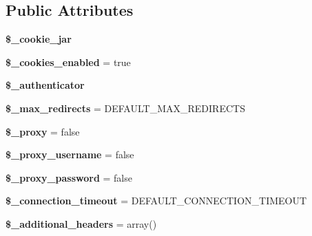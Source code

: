 \subsection*{Public Attributes}
\begin{DoxyCompactItemize}
\item 
\hypertarget{class_simple_user_agent_a3d18b9acde2c80d708830e1fb390cab1}{
{\bfseries \$\_\-cookie\_\-jar}}
\label{class_simple_user_agent_a3d18b9acde2c80d708830e1fb390cab1}

\item 
\hypertarget{class_simple_user_agent_ad9ae7a11c79c019476b3e1c997de314e}{
{\bfseries \$\_\-cookies\_\-enabled} = true}
\label{class_simple_user_agent_ad9ae7a11c79c019476b3e1c997de314e}

\item 
\hypertarget{class_simple_user_agent_a6de1b2cb4eb52ee8618b28a38f909f41}{
{\bfseries \$\_\-authenticator}}
\label{class_simple_user_agent_a6de1b2cb4eb52ee8618b28a38f909f41}

\item 
\hypertarget{class_simple_user_agent_add28eebb45b2a8c3367c808b9a87ad42}{
{\bfseries \$\_\-max\_\-redirects} = DEFAULT\_\-MAX\_\-REDIRECTS}
\label{class_simple_user_agent_add28eebb45b2a8c3367c808b9a87ad42}

\item 
\hypertarget{class_simple_user_agent_a492658a64e51df8c62ed3f3c0f81f8a7}{
{\bfseries \$\_\-proxy} = false}
\label{class_simple_user_agent_a492658a64e51df8c62ed3f3c0f81f8a7}

\item 
\hypertarget{class_simple_user_agent_ac393b2abbf99f7d593d55fc0a2aec300}{
{\bfseries \$\_\-proxy\_\-username} = false}
\label{class_simple_user_agent_ac393b2abbf99f7d593d55fc0a2aec300}

\item 
\hypertarget{class_simple_user_agent_a1e6a1d94440ae15c756567198901aa2d}{
{\bfseries \$\_\-proxy\_\-password} = false}
\label{class_simple_user_agent_a1e6a1d94440ae15c756567198901aa2d}

\item 
\hypertarget{class_simple_user_agent_ac9116a42bf40697455b70cf342726189}{
{\bfseries \$\_\-connection\_\-timeout} = DEFAULT\_\-CONNECTION\_\-TIMEOUT}
\label{class_simple_user_agent_ac9116a42bf40697455b70cf342726189}

\item 
\hypertarget{class_simple_user_agent_ae668ee58f6c2adee3c79ba2fe77d8c47}{
{\bfseries \$\_\-additional\_\-headers} = array()}
\label{class_simple_user_agent_ae668ee58f6c2adee3c79ba2fe77d8c47}

\end{DoxyCompactItemize}


